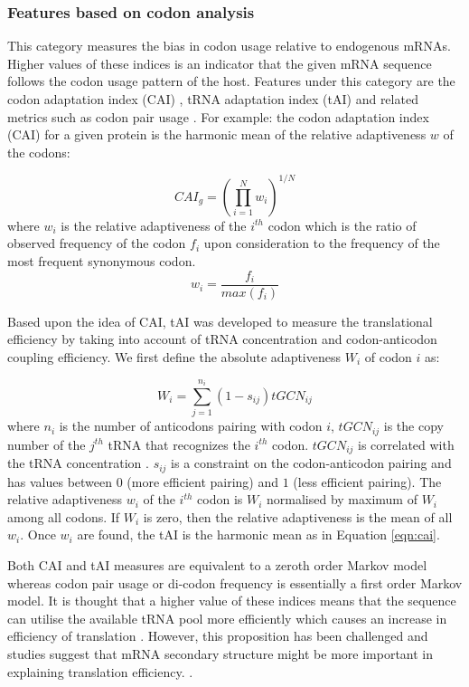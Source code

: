 

\subsubsection{Features based on codon analysis}
This category measures the bias in codon usage relative  to endogenous mRNAs. Higher values of these indices is an indicator that the given mRNA sequence follows the codon usage pattern of the host. Features under this category are the codon adaptation index (CAI) \cite{Sharp1987-ed}, tRNA adaptation index (tAI) \cite{ Reis2004-dl, Sabi2014-je} and related metrics such as codon pair usage \cite{Gutman1989-pn}. For example: the codon adaptation index (CAI) for a given protein is the harmonic mean of the relative adaptiveness $w$ \cite{Sharp1987-ed} of the codons:

\begin{equation}
    CAI_{g}=(\prod_{i=1}^{N} w_i)^{1/N}
    \label{eqn:cai}
\end{equation}
where $w_i$ is the relative adaptiveness of the $i^{th}$ codon which is the ratio of observed frequency of the codon $f_i$ upon consideration to the frequency of the most frequent synonymous codon. $$w_i = \frac{f_i}{max(f_i)}$$ 

Based upon the idea of CAI, tAI was developed to measure the translational efficiency by taking into account of tRNA concentration and codon-anticodon coupling efficiency. We first define the absolute adaptiveness $W_i$ of codon $i$ as:

\begin{equation}
    W_i = \sum_{j=1}^{n_i} (1 - s_{ij})tGCN_{ij}
\end{equation}
where $n_i$ is the number of anticodons pairing with codon $i$, $tGCN_{ij}$ is the copy number of the $j^{th}$ tRNA that recognizes the $i^{th}$ codon. $tGCN_{ij}$ is correlated with the tRNA concentration \cite{kanaya1999studies, novoa2012role}. $s_{ij}$ is a constraint on the codon-anticodon pairing and has values between $0$ (more efficient pairing) and $1$ (less efficient pairing). The relative adaptiveness $w_i$ of the $i^{th}$ codon is  $W_i$ normalised by maximum of $W_i$ among all codons. If $W_i$ is zero, then the relative adaptiveness is the mean of all $w_i$. Once $w_i$ are found, the tAI is the harmonic mean as in Equation \ref{eqn:cai}. 


Both CAI and tAI measures are equivalent to a zeroth order Markov model whereas codon pair usage or di-codon frequency is essentially a first order Markov model. It is thought that a higher value of these indices means that the sequence can utilise the available tRNA pool more efficiently which causes an increase in efficiency of translation \cite{ikemura1985codon, Gutman1989-pn, Sharp1987-ed, Reis2004-dl, Sabi2014-je, Brule2017-mx}. However, this proposition has been challenged and studies suggest that mRNA secondary structure might be more important in explaining translation efficiency.  \cite{Kudla2009-tl, Boel2016-jd, Cambray2018-kn}.